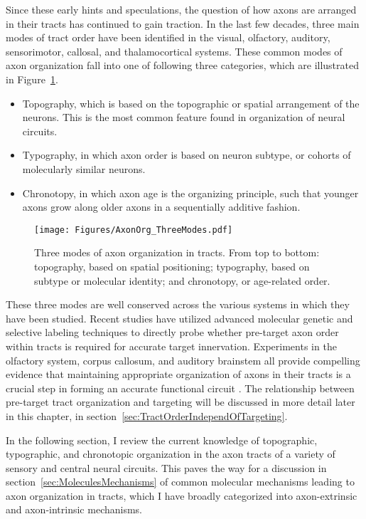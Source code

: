 Since these early hints and speculations, the question of how axons are arranged in their tracts has continued to gain traction.
In the last few decades, three main modes of tract order have been identified in the visual, olfactory, auditory, sensorimotor, callosal, and thalamocortical systems.
These common modes of axon organization fall into one of following three categories, which are illustrated in Figure~\ref{AxonOrg_ThreeModes}.
\begin{itemize}
\item Topography, which is based on the topographic or spatial arrangement of the neurons.
This is the most common feature found in organization of neural circuits.
\item Typography, in which axon order is based on neuron subtype, or cohorts of molecularly similar neurons.
\item Chronotopy, in which axon age is the organizing principle, such that younger axons grow along older axons in a sequentially additive fashion.
\end{itemize}
\begin{figure}[hbtp]
    \begin{center}
    \texttt{[image: Figures/AxonOrg\_ThreeModes.pdf]}
    \caption[Three modes of axon organization in tracts.]
	{Three modes of axon organization in tracts.
	From top to bottom: topography, based on spatial positioning; typography, based on subtype or molecular identity; and chronotopy, or age-related order. 
	\label{AxonOrg_ThreeModes}}
    \end{center}
\end{figure}
These three modes are well conserved across the various systems in which they have been studied.
Recent studies have utilized advanced molecular genetic and selective labeling techniques to directly probe whether pre-target axon order within tracts is required for accurate target innervation.
Experiments in the olfactory system, corpus callosum, and auditory brainstem all provide compelling evidence that maintaining appropriate organization of axons in their tracts is a crucial step in forming an accurate functional circuit \cite{imai2009pre,zhou2013axon,michalski2013robo3}.
The relationship between pre-target tract organization and targeting will be discussed in more detail later in this chapter, in section~\ref{sec:TractOrderIndependOfTargeting}.

In the following section, I review the current knowledge of topographic, typographic, and chronotopic organization in the axon tracts of a variety of sensory and central neural circuits.
This paves the way for a discussion in section~\ref{sec:MoleculesMechanisms} of common molecular mechanisms leading to axon organization in tracts, which I have broadly categorized into axon-extrinsic and axon-intrinsic mechanisms.